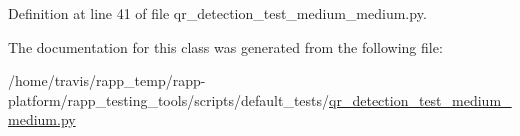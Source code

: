 Definition at line 41 of file qr\-\_\-detection\-\_\-test\-\_\-medium\-\_\-medium.\-py.



The documentation for this class was generated from the following file\-:\begin{DoxyCompactItemize}
\item 
/home/travis/rapp\-\_\-temp/rapp-\/platform/rapp\-\_\-testing\-\_\-tools/scripts/default\-\_\-tests/\hyperlink{qr__detection__test__medium__medium_8py}{qr\-\_\-detection\-\_\-test\-\_\-medium\-\_\-medium.\-py}\end{DoxyCompactItemize}
